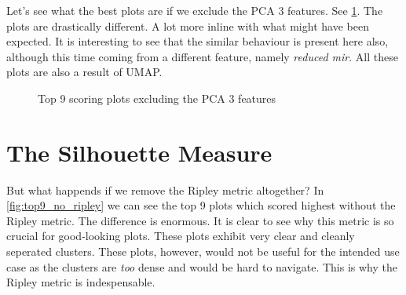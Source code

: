 \documentclass[a4paper, 12pt, twoside]{report}
\begin{document}
Let's see what the best plots are if we exclude the PCA 3 features. See \ref{fig:top9_no_pca3}. The plots are drastically different. A lot more inline with what might have been expected. It is interesting to see that the similar behaviour is present here also, although this time coming from a different feature, namely \textit{reduced mir}. All these plots are also a result of UMAP.

\begin{figure}[h!tbp]
\centering
{}
\caption{Top 9 scoring plots excluding the PCA 3 features}
\label{fig:top9_no_pca3}
\end{figure}

\section{The Silhouette Measure}

But what happends if we remove the Ripley metric altogether? In \ref{fig:top9_no_ripley} we can see the top 9 plots which scored highest without the Ripley metric. The difference is enormous. It is clear to see why this metric is so crucial for good-looking plots. These plots exhibit very clear and cleanly seperated clusters. These plots, however, would not be useful for the intended use case as the clusters are \textit{too} dense and would be hard to navigate. This is why the Ripley metric is indespensable.
\end{document}
